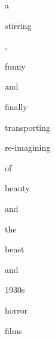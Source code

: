 \documentclass[varwidth]{standalone}
\begin{document}
\begin{CJK*}{UTF8}{gbsn}
{\setlength{\fboxsep}{0pt}\colorbox{white!0}{\parbox{0.9\textwidth}{
\colorbox{red!64.70588235294119}{\strut a} \colorbox{red!58.82352941176471}{\strut stirring} \colorbox{red!88.23529411764707}{\strut ,} \colorbox{red!47.05882352941177}{\strut funny} \colorbox{red!82.3529411764706}{\strut and} \colorbox{red!94.11764705882354}{\strut finally} \colorbox{red!76.47058823529412}{\strut transporting} \colorbox{red!23.529411764705884}{\strut re-imagining} \colorbox{red!29.411764705882355}{\strut of} \colorbox{red!11.764705882352942}{\strut beauty} \colorbox{red!35.294117647058826}{\strut and} \colorbox{red!41.1764705882353}{\strut the} \colorbox{red!17.647058823529413}{\strut beast} \colorbox{red!52.94117647058824}{\strut and} \colorbox{red!5.882352941176471}{\strut 1930s} \colorbox{red!0.0}{\strut horror} \colorbox{red!70.58823529411765}{\strut films} 
}}}
\end{CJK*}
\end{document}

